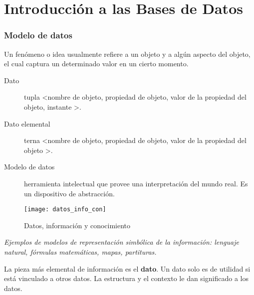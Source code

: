 \documentclass[a4paper, twoside]{article}
\newcommand{\rutapaquetes}{./paquetes-apunte}
\begin{document}
\maketitle

\tableofcontents


\part{Introducción a las Bases de Datos}

\section{Modelo de datos}
Un fenómeno o idea usualmente refiere a un objeto y a algún aspecto del objeto, el cual captura un determinado valor en un cierto momento.

\begin{description}
	\item [Dato] tupla \textless nombre de objeto, propiedad de objeto, valor de la propiedad del objeto, instante \textgreater .
	\item [Dato elemental] terna \textless nombre de objeto, propiedad de objeto, valor de la propiedad del objeto \textgreater .
	\item [Modelo de datos] herramienta intelectual que provee una interpretación del mundo real. Es un dispositivo de abstracción.
\end{description}

\begin{figure}[H]
	\centering
	\texttt{[image: datos\_info\_con]}
	\caption{Datos, información y conocimiento}
\end{figure}

\emph{Ejemplos de modelos de representación simbólica de la información: lenguaje natural, fórmulas matemáticas, mapas, partituras.}

La pieza más elemental de información es el \textbf{dato}. Un dato solo es de utilidad si está vinculado a otros datos. La estructura y el contexto le dan significado a los datos.
\end{document}
